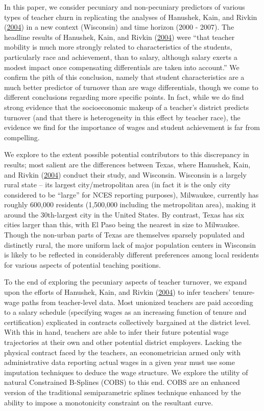 \documentclass[12pt,]{article}
\begin{document}
In this paper, we consider pecuniary and non-pecuniary predictors of
various types of teacher churn in replicating the analyses of Hanushek,
Kain, and Rivkin (\protect\hyperlink{ref-hanushek}{2004}) in a new
context (Wisconsin) and time horizon (2000 - 2007). The headline results
of Hanushek, Kain, and Rivkin (\protect\hyperlink{ref-hanushek}{2004})
were ``that teacher mobility is much more strongly related to
characteristics of the students, particularly race and achievement, than
to salary, although salary exerts a modest impact once compensating
differentials are taken into account.'' We confirm the pith of this
conclusion, namely that student characteristics are a much better
predictor of turnover than are wage differentials, though we come to
different conclusions regarding more specific points. In fact, while we
do find strong evidence that the socioeconomic makeup of a teacher's
district predicts turnover (and that there is heterogeneity in this
effect by teacher race), the evidence we find for the importance of
wages and student achievement is far from compelling.

We explore to the extent possible potential contributors to this
discrepancy in results; most salient are the differences between Texas,
where Hanushek, Kain, and Rivkin
(\protect\hyperlink{ref-hanushek}{2004}) conduct their study, and
Wisconsin. Wisconsin is a largely rural state -- its largest
city/metropolitan area (in fact it is the only city considered to be
``large'' for NCES reporting purposes), Milwaukee, currently has roughly
600,000 residents (1,500,000 including the metropolitan area), making it
around the 30th-largest city in the United States. By contrast, Texas
has six cities larger than this, with El Paso being the nearest in size
to Milwaukee. Though the non-urban parts of Texas are themselves
sparsely populated and distinctly rural, the more uniform lack of major
population centers in Wisconsin is likely to be reflected in
considerably different preferences among local residents for various
aspects of potential teaching positions.

To the end of exploring the pecuniary aspects of teacher turnover, we
expand upon the efforts of Hanushek, Kain, and Rivkin
(\protect\hyperlink{ref-hanushek}{2004}) to infer teachers' tenure-wage
paths from teacher-level data. Most unionized teachers are paid
according to a salary schedule (specifying wages as an increasing
function of tenure and certification) explicated in contracts
collectively bargained at the district level. With this in hand,
teachers are able to infer their future potential wage trajectories at
their own and other potential district employers. Lacking the physical
contract faced by the teachers, an econometrician armed only with
administrative data reporting actual wages in a given year must use some
imputation techniques to deduce the wage structure. We explore the
utility of natural Constrained B-Splines (COBS) to this end. COBS are an
enhanced version of the traditional semiparametric splines technique
enhanced by the ability to impose a monotonicity constraint on the
resultant curve.
\end{document}
